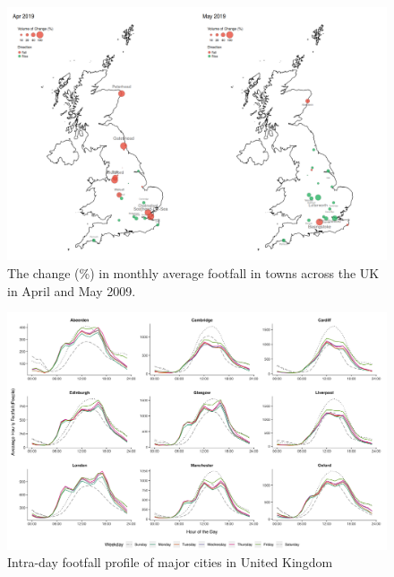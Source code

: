 \begin{figure}
  \forcerectofloat
  \includegraphics[trim={0 12 0 0},clip]{images/applications-city-indices.png}
  \caption{The change (\%) in monthly average footfall in towns across the UK in April and May 2009.}
  \label{figure:applications:cities:month}
\end{figure}

\begin{figure}
  \forcerectofloat
  \includegraphics[trim={0 10 0 0},clip]{images/applications-city-profiles.png}
  \caption{Intra-day footfall profile of major cities in United Kingdom}
  \label{figure:applications:cities:profiles}
\end{figure}

